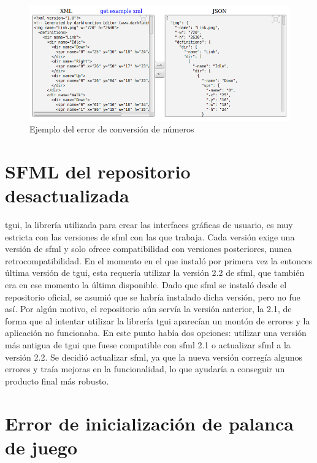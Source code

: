	\begin{figure}[!htp]
		 \centering
		 \includegraphics[scale=.5]{fig/conversionNums}
		 \caption{Ejemplo del error de conversión de números}
		 \label{fig:conversionNums}
	\end{figure}

	\FloatBarrier

\section{SFML del repositorio desactualizada}

	\acrshort{tgui}, la librería utilizada para crear las interfaces gráficas de usuario, es muy estricta con las versiones de \acrshort{sfml} con las que trabaja. Cada versión exige una versión de \acrshort{sfml} y solo ofrece compatibilidad con versiones posteriores, nunca retrocompatibilidad. En el momento en el que instaló por primera vez la entonces última versión de \acrshort{tgui}, esta requería utilizar la versión 2.2 de \acrshort{sfml}, que también era en ese momento la última disponible. Dado que \acrshort{sfml} se instaló desde el repositorio oficial, se asumió que se habría instalado dicha versión, pero no fue así. Por algún motivo, el repositorio aún servía la versión anterior, la 2.1, de forma que al intentar utilizar la librería \acrshort{tgui} aparecían un montón de errores y la aplicación no funcionaba. En este punto había dos opciones: utilizar una versión más antigua de \acrshort{tgui} que fuese compatible con \acrshort{sfml} 2.1 o actualizar \acrshort{sfml} a la versión 2.2. Se decidió actualizar \acrshort{sfml}, ya que la nueva versión corregía algunos errores y traía mejoras en la funcionalidad, lo que ayudaría a conseguir un producto final más robusto.

\section{Error de inicialización de palanca de juego}

